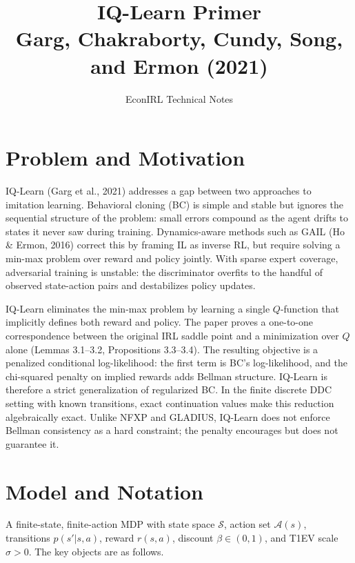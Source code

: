 \documentclass[10pt]{article}
\title{IQ-Learn Primer\\[2pt]
\large Garg, Chakraborty, Cundy, Song, and Ermon (2021)}
\author{EconIRL Technical Notes}
\date{}
\begin{document}
\maketitle
\vspace{-1em}

\section{Problem and Motivation}

IQ-Learn (Garg et al., 2021) addresses a gap between two approaches to imitation learning. Behavioral cloning (BC) is simple and stable but ignores the sequential structure of the problem: small errors compound as the agent drifts to states it never saw during training. Dynamics-aware methods such as GAIL (Ho \& Ermon, 2016) correct this by framing IL as inverse RL, but require solving a min-max problem over reward and policy jointly. With sparse expert coverage, adversarial training is unstable: the discriminator overfits to the handful of observed state-action pairs and destabilizes policy updates.

IQ-Learn eliminates the min-max problem by learning a single $Q$-function that implicitly defines both reward and policy. The paper proves a one-to-one correspondence between the original IRL saddle point and a minimization over $Q$ alone (Lemmas 3.1--3.2, Propositions 3.3--3.4). The resulting objective is a penalized conditional log-likelihood: the first term is BC's log-likelihood, and the chi-squared penalty on implied rewards adds Bellman structure. IQ-Learn is therefore a strict generalization of regularized BC. In the finite discrete DDC setting with known transitions, exact continuation values make this reduction algebraically exact. Unlike NFXP and GLADIUS, IQ-Learn does not enforce Bellman consistency as a hard constraint; the penalty encourages but does not guarantee it.


\section{Model and Notation}

A finite-state, finite-action MDP with state space $\mathcal{S}$, action set $\mathcal{A}(s)$, transitions $p(s'|s,a)$, reward $r(s,a)$, discount $\beta \in (0,1)$, and T1EV scale $\sigma > 0$. The key objects are as follows.
\end{document}
